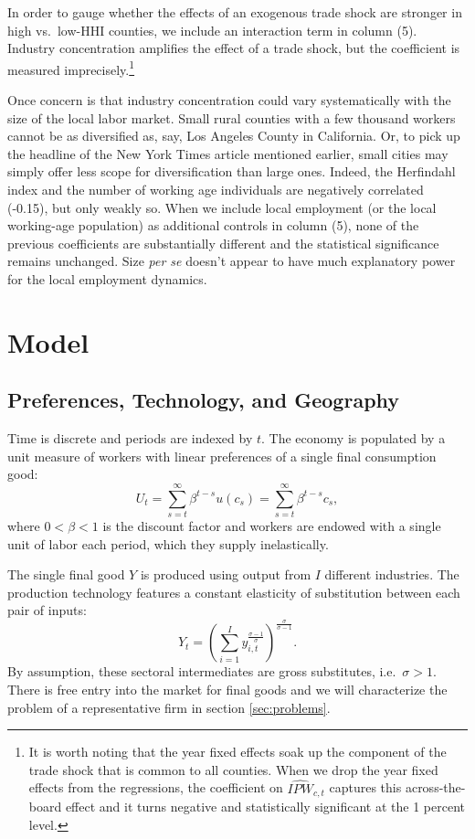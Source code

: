 \documentclass[onehalfspacing,11pt]{article}
\begin{document}
In order to gauge whether the effects of an exogenous trade shock are stronger in high vs.~low-HHI counties, we include an interaction term in column (5). Industry concentration amplifies the effect of a trade shock, but the coefficient is measured imprecisely.\footnote{It is worth noting that the year fixed effects soak up the component of the trade shock that is common to all counties. When we drop the year fixed effects from the regressions, the coefficient on $\widehat{IPW}_{c,t}$ captures this across-the-board effect and it turns negative and statistically significant at the 1 percent level.}

Once concern is that industry concentration could vary systematically with the size of the local labor market. Small rural counties with a few thousand workers cannot be as diversified as, say, Los Angeles County in California. Or, to pick up the headline of the New York Times article mentioned earlier, small cities may simply offer less scope for diversification than large ones. Indeed, the Herfindahl index and the number of working age individuals are negatively correlated (-0.15), but only weakly so. When we include local employment (or the local working-age population) as additional controls in column (5), none of the previous coefficients are substantially different and the statistical significance remains unchanged. Size {\it per se} doesn't appear to have much explanatory power for the local employment dynamics.

\section{Model}
\subsection{Preferences, Technology, and Geography}\label{sec:preferences}
Time is discrete and periods are indexed by $t$. The economy is populated by a unit measure of workers with linear preferences of a single final consumption good:
\begin{equation}
\label{eq:U}
U_t = \sum_{s=t}^\infty \beta^{t-s} u(c_s) = \sum_{s=t}^\infty \beta^{t-s} c_s,
\end{equation}
where $0<\beta < 1$ is the discount factor and workers are endowed with a single unit of labor each period, which they supply inelastically.

The single final good $Y$ is produced using output from $I$ different industries. The production technology features a constant elasticity of substitution between each pair of inputs:
\begin{equation}
\label{eq:Y}
Y_t = \left( \sum_{i=1}^I y_{i,t}^{\frac{\sigma-1}{\sigma}} \right)^{\frac{\sigma}{\sigma-1}}.
\end{equation}
By assumption, these sectoral intermediates are gross substitutes, i.e.~$\sigma>1$. There is free entry into the market for final goods and we will characterize the problem of a representative firm in section \ref{sec:problems}.
\end{document}
